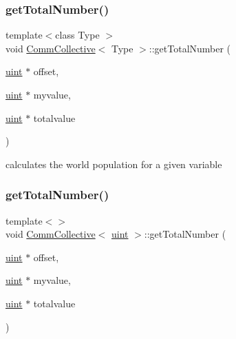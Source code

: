 \subsubsection{\texorpdfstring{get\+Total\+Number()}{getTotalNumber()}\hspace{0.1cm}{\footnotesize\ttfamily [1/2]}}
{\footnotesize\ttfamily template$<$class Type $>$ \\
void \mbox{\hyperlink{classCommCollective}{Comm\+Collective}}$<$ Type $>$\+::get\+Total\+Number (\begin{DoxyParamCaption}\item[{\mbox{\hyperlink{definitions_8h_a69aa29b598b851b0640aa225a9e5d61d}{uint}} $\ast$}]{offset,  }\item[{\mbox{\hyperlink{definitions_8h_a69aa29b598b851b0640aa225a9e5d61d}{uint}} $\ast$}]{myvalue,  }\item[{\mbox{\hyperlink{definitions_8h_a69aa29b598b851b0640aa225a9e5d61d}{uint}} $\ast$}]{totalvalue }\end{DoxyParamCaption})}

calculates the world population for a given variable \mbox{\label{classCommCollective_a493fba4b35a6f42599753b48c431684a}} 
\subsubsection{\texorpdfstring{get\+Total\+Number()}{getTotalNumber()}\hspace{0.1cm}{\footnotesize\ttfamily [2/2]}}
{\footnotesize\ttfamily template$<$$>$ \\
void \mbox{\hyperlink{classCommCollective}{Comm\+Collective}}$<$ \mbox{\hyperlink{definitions_8h_a69aa29b598b851b0640aa225a9e5d61d}{uint}} $>$\+::get\+Total\+Number (\begin{DoxyParamCaption}\item[{\mbox{\hyperlink{definitions_8h_a69aa29b598b851b0640aa225a9e5d61d}{uint}} $\ast$}]{offset,  }\item[{\mbox{\hyperlink{definitions_8h_a69aa29b598b851b0640aa225a9e5d61d}{uint}} $\ast$}]{myvalue,  }\item[{\mbox{\hyperlink{definitions_8h_a69aa29b598b851b0640aa225a9e5d61d}{uint}} $\ast$}]{totalvalue }\end{DoxyParamCaption})}

